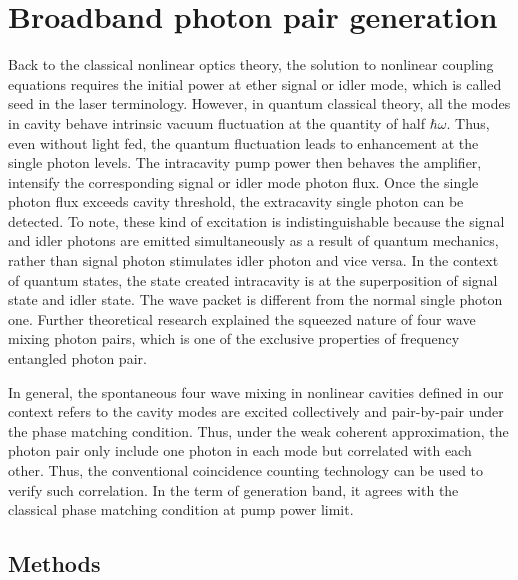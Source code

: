 \chapter{Broadband photon pair generation}

Back to the classical nonlinear optics theory, the solution to nonlinear coupling equations requires the initial power at ether signal or idler mode, which is called seed in the laser terminology. However, in quantum classical theory, all the modes in cavity behave intrinsic vacuum fluctuation at the quantity of half $ \hbar \omega $. Thus, even without light fed, the quantum fluctuation leads to enhancement at the single photon levels. The intracavity pump power then behaves the amplifier, intensify the corresponding signal or idler mode photon flux. Once the single photon flux exceeds cavity threshold, the extracavity single photon can be detected. To note, these kind of excitation is indistinguishable because the signal and idler photons are emitted simultaneously as a result of quantum mechanics, rather than signal photon stimulates idler photon and vice versa. In the context of quantum states, the state created intracavity is at the superposition of signal state and idler state. The wave packet is different from the normal single photon one. Further theoretical research \cite{Scully1997} explained the squeezed nature of four wave mixing photon pairs, which is one of the exclusive properties of frequency entangled photon pair.

In general, the spontaneous four wave mixing in nonlinear cavities defined in our context refers to the cavity modes are excited collectively and pair-by-pair under the phase matching condition. Thus, under the weak coherent approximation, the photon pair only include one photon in each mode but correlated with each other. Thus, the conventional coincidence counting technology can be used to verify such correlation. In the term of generation band, it agrees with the classical phase matching condition at pump power limit.


\section{Methods}

